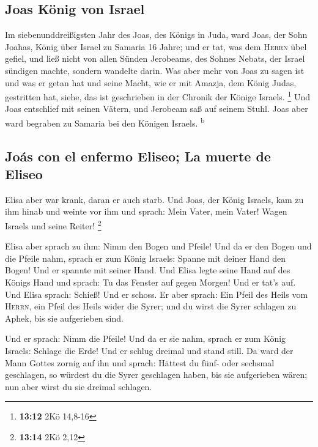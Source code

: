 \hypertarget{joas-kuxf6nig-von-israel}{%
\subsection{Joas König von Israel}\label{joas-kuxf6nig-von-israel}}

 Im siebenunddreißigsten Jahr des Joas, des Königs in
Juda, ward Joas, der Sohn Joahas, König über Israel zu Samaria 16 Jahre;
 und er tat, was dem \textsc{Herrn} übel gefiel, und ließ
nicht von allen Sünden Jerobeams, des Sohnes Nebats, der Israel sündigen
machte, sondern wandelte darin.  Was aber mehr von Joas
zu sagen ist und was er getan hat und seine Macht, wie er mit Amazja,
dem König Judas, gestritten hat, siehe, das ist geschrieben in der
Chronik der Könige Israels. \footnote{\textbf{13:12} 2Kö 14,8-16}
 Und Joas entschlief mit seinen Vätern, und Jerobeam saß
auf seinem Stuhl. Joas aber ward begraben zu Samaria bei den Königen
Israels. \textsuperscript{b}

\hypertarget{jouxe1s-con-el-enfermo-eliseo-la-muerte-de-eliseo}{%
\subsection{Joás con el enfermo Eliseo; La muerte de
Eliseo}\label{jouxe1s-con-el-enfermo-eliseo-la-muerte-de-eliseo}}

 Elisa aber war krank, daran er auch starb. Und Joas, der
König Israels, kam zu ihm hinab und weinte vor ihm und sprach: Mein
Vater, mein Vater! Wagen Israels und seine Reiter! \footnote{\textbf{13:14}
  2Kö 2,12}

 Elisa aber sprach zu ihm: Nimm den Bogen und Pfeile! Und
da er den Bogen und die Pfeile nahm,  sprach er zum König
Israels: Spanne mit deiner Hand den Bogen! Und er spannte mit seiner
Hand. Und Elisa legte seine Hand auf des Königs Hand  und
sprach: Tu das Fenster auf gegen Morgen! Und er tat's auf. Und Elisa
sprach: Schieß! Und er schoss. Er aber sprach: Ein Pfeil des Heils vom
\textsc{Herrn}, ein Pfeil des Heils wider die Syrer; und du wirst die
Syrer schlagen zu Aphek, bis sie aufgerieben sind.

 Und er sprach: Nimm die Pfeile! Und da er sie nahm,
sprach er zum König Israels: Schlage die Erde! Und er schlug dreimal und
stand still.  Da ward der Mann Gottes zornig auf ihn und
sprach: Hättest du fünf- oder sechsmal geschlagen, so würdest du die
Syrer geschlagen haben, bis sie aufgerieben wären; nun aber wirst du sie
dreimal schlagen.

